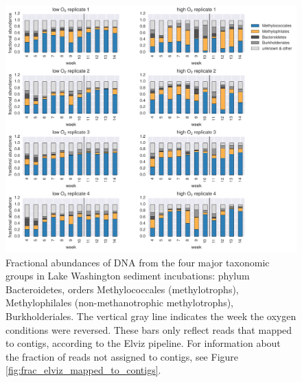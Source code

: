 \begin{figure}[H]
\centering
    \includegraphics[width=1.0\textwidth]{./tex/chapter2/figures/170413_4_main_groups.pdf}  %
    \begin{singlespace}
    \caption[Four major taxonomic groups in Lake Washington sediment incubations]{
        Fractional abundances of DNA from the four major taxonomic groups in Lake Washington sediment incubations:
	    phylum Bacteroidetes, orders Methylococcales (methylotrophs), Methylophilales (non-methanotrophic methylotrophs), Burkholderiales.
        The vertical gray line indicates the week the oxygen conditions were reversed.
        These bars only reflect reads that mapped to contigs, according to the Elviz pipeline.
        For information about the fraction of reads not assigned to contigs, see Figure \ref{fig:frac_elviz_mapped_to_contigs}.
        }
    \label{fig:4dominant_groups}
    \end{singlespace}
\end{figure}

